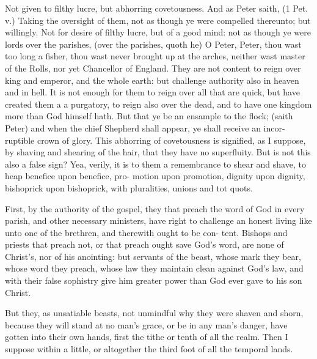 \documentclass{custom}
\begin{document}
Not given to filthy lucre, but abhorring covetousness. 
And as Peter saith, (1 Pet. v.) Taking the oversight of 
them, not as though ye were compelled thereunto; but 
willingly. Not for desire of filthy lucre, but of a good 
mind: not as though ye were lords over the parishes, (over 
the parishes, quoth he) O Peter, Peter, thou wast too 
long a fisher, thou wast never brought up at the arches, 
neither wast master of the Rolls, nor yet Chancellor of 
England. They are not content to reign over king and 
emperor, and the whole earth: but challenge authority 
also in heaven and in hell. It is not enough for them to 
reign over all that are quick, but have created them a 
a purgatory, to reign also over the dead, and to have one 
kingdom more than God himself hath. But that ye be 
an ensample to the flock; (saith Peter) and when the 
chief Shepherd shall appear, ye shall receive an incor- 
ruptible crown of glory. This abhorring of covetousness 
is signified, as I suppose, by shaving and shearing of the 
hair, that they have no superfluity. But is not this also 
a false sign? Yea, verily, it is to them a remembrance 
to shear and shave, to heap benefice upon benefice, pro- 
motion upon promotion, dignity upon dignity, bishoprick 
upon bishoprick, with pluralities, unions and tot quots. 

First, by the authority of the gospel, they that preach 
the word of God in every parish, and other necessary 
ministers, have right to challenge an honest living like 
unto one of the brethren, and therewith ought to be con- 
tent. Bishops and priests that preach not, or that preach 
ought save God's word, are none of Christ's, nor of his 
anointing: but servants of the beast, whose mark they 
bear, whose word they preach, whose law they maintain 
clean against God's law, and with their false sophistry give 
him greater power than God ever gave to his son Christ. 

But they, as unsatiable beasts, not unmindful why they 
were shaven and shorn, because they will stand at no man's 
grace, or be in any man's danger, have gotten into their 
own hands, first the tithe or tenth of all the realm. Then 
I suppose within a little, or altogether the third foot of 
all the temporal lands. 
\end{document}
